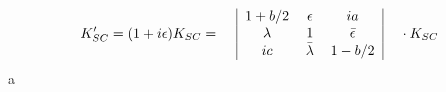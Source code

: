 \begin{equation}\label{leftN2}
K'_{SC}=(1+i\epsilon)K_{SC}=
\begin{tabular}{c|ccc|c}
  &$1+b/2 $&$\epsilon$&$i a$&\\
  &$\lambda$&$1$&${\bar \epsilon}$&\\
  & $i c$&${\bar\lambda}$&$1-b/2 $&\\
\end{tabular}\\ \cdot K_{SC}
\end{equation}a
